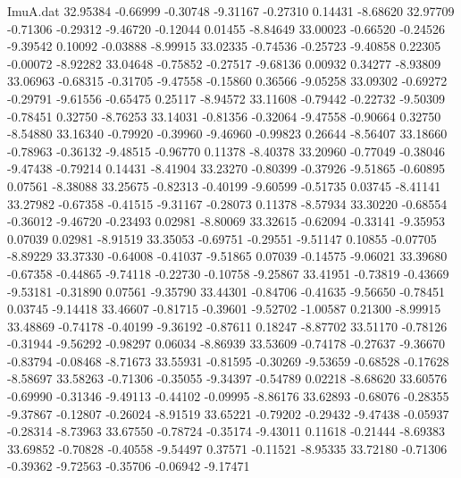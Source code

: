\begin{filecontents}{ImuA.dat}
  32.95384   -0.66999   -0.30748   -9.31167   -0.27310    0.14431   -8.68620
  32.97709   -0.71306   -0.29312   -9.46720   -0.12044    0.01455   -8.84649
  33.00023   -0.66520   -0.24526   -9.39542    0.10092   -0.03888   -8.99915
  33.02335   -0.74536   -0.25723   -9.40858    0.22305   -0.00072   -8.92282
  33.04648   -0.75852   -0.27517   -9.68136    0.00932    0.34277   -8.93809
  33.06963   -0.68315   -0.31705   -9.47558   -0.15860    0.36566   -9.05258
  33.09302   -0.69272   -0.29791   -9.61556   -0.65475    0.25117   -8.94572
  33.11608   -0.79442   -0.22732   -9.50309   -0.78451    0.32750   -8.76253
  33.14031   -0.81356   -0.32064   -9.47558   -0.90664    0.32750   -8.54880
  33.16340   -0.79920   -0.39960   -9.46960   -0.99823    0.26644   -8.56407
  33.18660   -0.78963   -0.36132   -9.48515   -0.96770    0.11378   -8.40378
  33.20960   -0.77049   -0.38046   -9.47438   -0.79214    0.14431   -8.41904
  33.23270   -0.80399   -0.37926   -9.51865   -0.60895    0.07561   -8.38088
  33.25675   -0.82313   -0.40199   -9.60599   -0.51735    0.03745   -8.41141
  33.27982   -0.67358   -0.41515   -9.31167   -0.28073    0.11378   -8.57934
  33.30220   -0.68554   -0.36012   -9.46720   -0.23493    0.02981   -8.80069
  33.32615   -0.62094   -0.33141   -9.35953    0.07039    0.02981   -8.91519
  33.35053   -0.69751   -0.29551   -9.51147    0.10855   -0.07705   -8.89229
  33.37330   -0.64008   -0.41037   -9.51865    0.07039   -0.14575   -9.06021
  33.39680   -0.67358   -0.44865   -9.74118   -0.22730   -0.10758   -9.25867
  33.41951   -0.73819   -0.43669   -9.53181   -0.31890    0.07561   -9.35790
  33.44301   -0.84706   -0.41635   -9.56650   -0.78451    0.03745   -9.14418
  33.46607   -0.81715   -0.39601   -9.52702   -1.00587    0.21300   -8.99915
  33.48869   -0.74178   -0.40199   -9.36192   -0.87611    0.18247   -8.87702
  33.51170   -0.78126   -0.31944   -9.56292   -0.98297    0.06034   -8.86939
  33.53609   -0.74178   -0.27637   -9.36670   -0.83794   -0.08468   -8.71673
  33.55931   -0.81595   -0.30269   -9.53659   -0.68528   -0.17628   -8.58697
  33.58263   -0.71306   -0.35055   -9.34397   -0.54789    0.02218   -8.68620
  33.60576   -0.69990   -0.31346   -9.49113   -0.44102   -0.09995   -8.86176
  33.62893   -0.68076   -0.28355   -9.37867   -0.12807   -0.26024   -8.91519
  33.65221   -0.79202   -0.29432   -9.47438   -0.05937   -0.28314   -8.73963
  33.67550   -0.78724   -0.35174   -9.43011    0.11618   -0.21444   -8.69383
  33.69852   -0.70828   -0.40558   -9.54497    0.37571   -0.11521   -8.95335
  33.72180   -0.71306   -0.39362   -9.72563   -0.35706   -0.06942   -9.17471

\end{filecontents}
